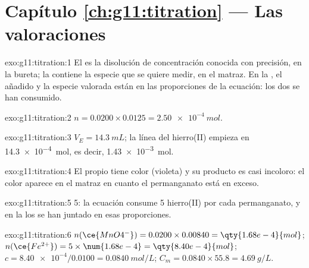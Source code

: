 \section*{Capítulo \ref{ch:g11:titration} --- Las valoraciones}

\begin{solution}{exo:g11:titration:1}
El  es la disolución de concentración conocida con precisión,
en la bureta; la  contiene la especie que se quiere
medir, en el matraz. En la , el  añadido y la
especie valorada están en las proporciones de la ecuación: los dos se
han consumido.
\end{solution}

\begin{solution}{exo:g11:titration:2}
$n = 0.0200 \times 0.0125 = \qty{2.50e-4}{mol}$.
\end{solution}

\begin{solution}{exo:g11:titration:3}
$V_E = \qty{14.3}{mL}$; la línea del hierro(II) empieza en
\qty{14.3e-4}{mol}, es decir, \qty{1.43e-3}{mol}.
\end{solution}

\begin{solution}{exo:g11:titration:4}
El propio  tiene color (violeta) y su producto es casi
incoloro: el color aparece en el matraz en cuanto el permanganato está
en exceso.
\end{solution}

\begin{solution}{exo:g11:titration:5}
5: la ecuación consume 5  hierro(II) por cada  permanganato, y
en la  los  se han juntado en esas proporciones.
\end{solution}

\begin{solution}{exo:g11:titration:6}
$n(\ce{MnO4^-}) = 0.0200 \times 0.00840 = \qty{1.68e-4}{mol}$;
$n(\ce{Fe^{2+}}) = 5 \times \num{1.68e-4} = \qty{8.40e-4}{mol}$;
$c = \num{8.40e-4} / 0.0100 = \qty{0.0840}{mol/L}$;
$C_m = 0.0840 \times 55.8 = \qty{4.69}{g/L}$.
\end{solution}

